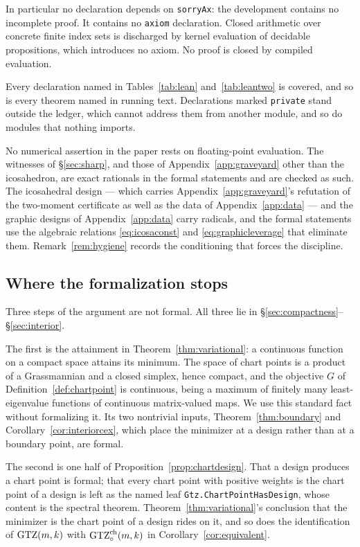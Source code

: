 In particular no declaration depends on \texttt{sorryAx}: the development
contains no incomplete proof.  It contains no \texttt{axiom} declaration.
Closed arithmetic over concrete finite index sets is discharged by kernel
evaluation of decidable propositions, which introduces no axiom.  No proof
is closed by compiled evaluation.

Every declaration named in Tables~\ref{tab:lean} and~\ref{tab:leantwo} is
covered, and so is every theorem named in running text.  Declarations marked
\texttt{private} stand outside the ledger, which cannot address them from
another module, and so do modules that nothing imports.

No numerical assertion in the paper rests on floating-point evaluation.  The
witnesses of \S\ref{sec:sharp}, and those of
Appendix~\ref{app:graveyard} other than the icosahedron, are exact
rationals in the formal statements and are checked as such.  The
icosahedral design --- which carries Appendix~\ref{app:graveyard}'s refutation
of the two-moment certificate as well as the data of
Appendix~\ref{app:data} --- and the graphic designs of
Appendix~\ref{app:data} carry radicals, and the
formal statements use the algebraic relations \eqref{eq:icosaconst} and
\eqref{eq:graphicleverage} that eliminate them.  Remark~\ref{rem:hygiene}
records the conditioning that forces the discipline.

\subsection{Where the formalization stops}\label{sec:boundaries}

Three steps of the argument are not formal.  All three lie in
\S\ref{sec:compactness}--\S\ref{sec:interior}.

The first is the attainment in Theorem~\ref{thm:variational}: a continuous
function on a compact space attains its minimum.  The space of chart points is
a product of a Grassmannian and a closed simplex, hence compact, and the
objective $G$ of Definition~\ref{def:chartpoint} is continuous, being a maximum
of finitely many least-eigenvalue functions of continuous matrix-valued maps.
We use this standard fact without formalizing it.  Its two nontrivial
inputs, Theorem~\ref{thm:boundary} and Corollary~\ref{cor:interiorcex},
which place the minimizer at a design rather than at a boundary point,
are formal.

The second is one half of Proposition~\ref{prop:chartdesign}.  That a design
produces a chart point is formal; that every chart point with positive
weights is the chart point of a design is left as the named leaf
\texttt{Gtz.ChartPointHasDesign}, whose content is the spectral theorem.
Theorem~\ref{thm:variational}'s conclusion that the minimizer is the chart
point of a design rides on it, and so does the identification of
$\mathrm{GTZ}(m,k)$ with $\mathrm{GTZ}^{\mathrm{ch}}_{\circ}(m,k)$ in
Corollary~\ref{cor:equivalent}.

